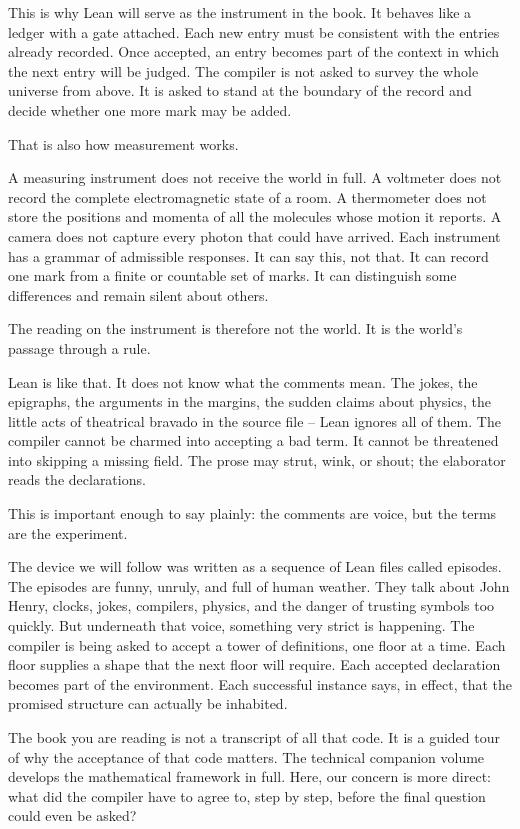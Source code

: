 This is why Lean will serve as the instrument in the book. It behaves like a
ledger with a gate attached. Each new entry must be consistent with the entries
already recorded. Once accepted, an entry becomes part of the context in which
the next entry will be judged. The compiler is not asked to survey the whole
universe from above. It is asked to stand at the boundary of the record and
decide whether one more mark may be added.

That is also how measurement works.

A measuring instrument does not receive the world in full. A voltmeter does not
record the complete electromagnetic state of a room. A thermometer does not
store the positions and momenta of all the molecules whose motion it reports. A
camera does not capture every photon that could have arrived. Each instrument
has a grammar of admissible responses. It can say this, not that. It can record
one mark from a finite or countable set of marks. It can distinguish some
differences and remain silent about others.

The reading on the instrument is therefore not the world. It is the world's
passage through a rule.

Lean is like that. It does not know what the comments mean. The jokes, the
epigraphs, the arguments in the margins, the sudden claims about physics, the
little acts of theatrical bravado in the source file -- Lean ignores all of
them. The compiler cannot be charmed into accepting a bad term. It cannot be
threatened into skipping a missing field. The prose may strut, wink, or shout;
the elaborator reads the declarations.

This is important enough to say plainly: the comments are voice, but the terms
are the experiment.

The device we will follow was written as a sequence of Lean files called
episodes. The episodes are funny, unruly, and full of human weather. They talk
about John Henry, clocks, jokes, compilers, physics, and the danger of trusting
symbols too quickly. But underneath that voice, something very strict is
happening. The compiler is being asked to accept a tower of definitions, one
floor at a time. Each floor supplies a shape that the next floor will require.
Each accepted declaration becomes part of the environment. Each successful
instance says, in effect, that the promised structure can actually be inhabited.

The book you are reading is not a transcript of all that code. It is a guided
tour of why the acceptance of that code matters. The technical companion volume
develops the mathematical framework in full. Here, our concern is more direct:
what did the compiler have to agree to, step by step, before the final question
could even be asked?


